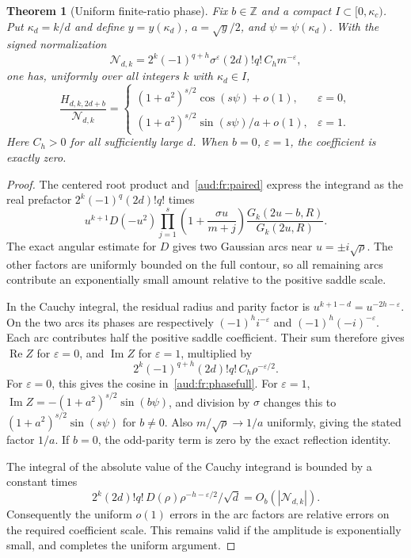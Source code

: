 \documentclass[11pt,a4paper]{article}
\numberwithin{equation}{section}
\newtheorem{theorem}{Theorem}[section]
\begin{document}
\begin{theorem}[Uniform finite-ratio phase]\label{aud:fr:phasethm}
Fix $b\in\mathbb Z$ and a compact $I\subset[0,\kappa_c)$. Put $\kappa_d=k/d$ and define $y=y(\kappa_d)$, $a=\sqrt y/2$, and $\psi=\psi(\kappa_d)$. With the signed normalization
\begin{equation}\label{aud:fr:N}
 \mathcal N_{d,k}
 =2^k(-1)^{q+h}\sigma^\varepsilon(2d)!q!\,C_hm^{-\varepsilon},
\end{equation}
one has, uniformly over all integers $k$ with $\kappa_d\in I$,
\begin{equation}\label{aud:fr:phasefull}
 \frac{H_{d,k,2d+b}}{\mathcal N_{d,k}}
 =\begin{cases}
 (1+a^2)^{s/2}\cos(s\psi)+o(1),&\varepsilon=0,\\
 (1+a^2)^{s/2}\sin(s\psi)/a+o(1),&\varepsilon=1.
 \end{cases}
\end{equation}
Here $C_h>0$ for all sufficiently large $d$. When $b=0$, $\varepsilon=1$, the coefficient is exactly zero.
\end{theorem}
\begin{proof}
The centered root product and~\eqref{aud:fr:paired} express the integrand as the real prefactor $2^k(-1)^q(2d)!q!$ times
\[
 u^{k+1}D(-u^2)
 \prod_{j=1}^s\left(1+\frac{\sigma u}{m+j}\right)
 \frac{G_k(2u-b,R)}{G_k(2u,R)}.
\]
The exact angular estimate for $D$ gives two Gaussian arcs near $u=\pm i\sqrt\rho$. The other factors are uniformly bounded on the full contour, so all remaining arcs contribute an exponentially small amount relative to the positive saddle scale.

In the Cauchy integral, the residual radius and parity factor is $u^{k+1-d}=u^{-2h-\varepsilon}$. On the two arcs its phases are respectively $(-1)^hi^{-\varepsilon}$ and $(-1)^h(-i)^{-\varepsilon}$. Each arc contributes half the positive saddle coefficient. Their sum therefore gives $\operatorname{Re}Z$ for $\varepsilon=0$, and $\operatorname{Im}Z$ for $\varepsilon=1$, multiplied by
\[
 2^k(-1)^{q+h}(2d)!q!\,C_h\rho^{-\varepsilon/2}.
\]
For $\varepsilon=0$, this gives the cosine in~\eqref{aud:fr:phasefull}. For $\varepsilon=1$, $\operatorname{Im}Z=-(1+a^2)^{s/2}\sin(b\psi)$, and division by $\sigma$ changes this to $(1+a^2)^{s/2}\sin(s\psi)$ for $b\ne0$. Also $m/\sqrt\rho\to1/a$ uniformly, giving the stated factor $1/a$. If $b=0$, the odd-parity term is zero by the exact reflection identity.

The integral of the absolute value of the Cauchy integrand is bounded by a constant times
\[
 2^k(2d)!q!\,D(\rho)\rho^{-h-\varepsilon/2}/\sqrt d
 =O_b(|\mathcal N_{d,k}|).
\]
Consequently the uniform $o(1)$ errors in the arc factors are relative errors on the required coefficient scale. This remains valid if the amplitude is exponentially small, and completes the uniform argument.
\end{proof}
\end{document}
